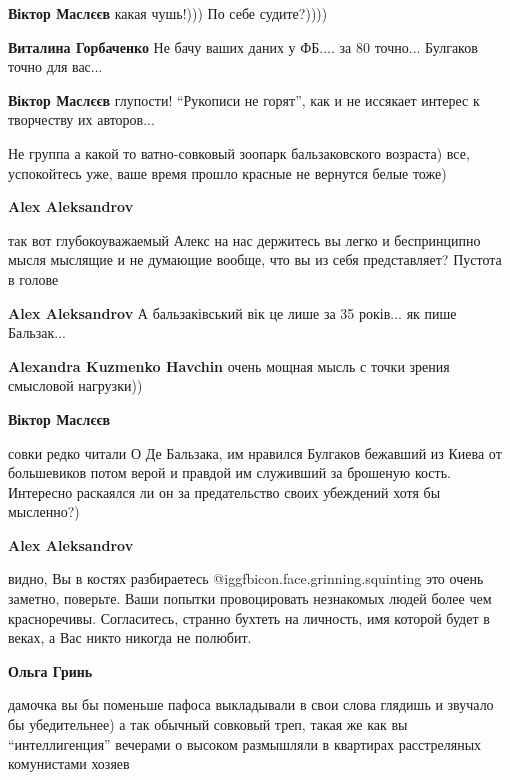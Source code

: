 \begin{itemize}
\begin{itemize}
\textbf{Віктор Маслєєв} какая чушь!))) По себе судите?))))

\begin{itemize} %
\textbf{Виталина Горбаченко}
Не бачу ваших даних у ФБ.... за 80 точно... Булгаков точно для вас...
\end{itemize} %

\textbf{Віктор Маслєєв} глупости! \enquote{Рукописи не горят}, как и не иссякает интерес к творчеству их авторов...


Не группа а какой то ватно-совковый зоопарк бальзаковского возраста) все,
успокойтесь уже, ваше время прошло красные не вернутся белые тоже)

\begin{itemize} %
\textbf{Alex Aleksandrov} 

так вот глубокоуважаемый Алекс на нас держитесь вы легко и беспринципно мысля
мыслящие и не думающие вообще, что вы из себя представляет? Пустота в голове


\textbf{Alex Aleksandrov}
А бальзаківський вік це лише за 35 років... як пише Бальзак...

\textbf{Alexandra Kuzmenko Havchin} очень мощная мысль с точки зрения смысловой нагрузки))

\textbf{Віктор Маслєєв} 

совки редко читали О Де Бальзака, им нравился Булгаков бежавший из Киева от
большевиков потом верой и правдой им служивший за брошеную кость. Интересно
раскаялся ли он за предательство своих убеждений хотя бы мысленно?)

\textbf{Alex Aleksandrov} 

видно, Вы в костях разбираетесь @igg{fbicon.face.grinning.squinting}  это очень
заметно, поверьте. Ваши попытки провоцировать незнакомых людей более чем
красноречивы. Согласитесь, странно бухтеть на личность, имя которой будет в
веках, а Вас никто никогда не полюбит.

\textbf{Ольга Гринь} 

дамочка вы бы поменьше пафоса выкладывали в свои слова глядишь и звучало бы
убедительнее) а так обычный совковый треп, такая же как вы
\enquote{интеллигенция} вечерами о высоком размышляли в квартирах расстреляных
комунистами хозяев


\end{itemize}
\end{itemize}
\end{itemize}

